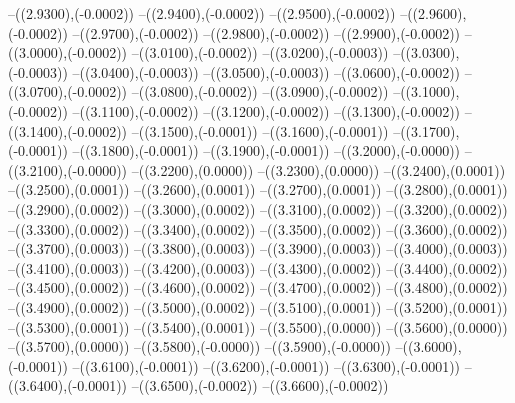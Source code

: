 {	--({\sx*(2.9300)},{\sy*(-0.0002)})
	--({\sx*(2.9400)},{\sy*(-0.0002)})
	--({\sx*(2.9500)},{\sy*(-0.0002)})
	--({\sx*(2.9600)},{\sy*(-0.0002)})
	--({\sx*(2.9700)},{\sy*(-0.0002)})
	--({\sx*(2.9800)},{\sy*(-0.0002)})
	--({\sx*(2.9900)},{\sy*(-0.0002)})
	--({\sx*(3.0000)},{\sy*(-0.0002)})
	--({\sx*(3.0100)},{\sy*(-0.0002)})
	--({\sx*(3.0200)},{\sy*(-0.0003)})
	--({\sx*(3.0300)},{\sy*(-0.0003)})
	--({\sx*(3.0400)},{\sy*(-0.0003)})
	--({\sx*(3.0500)},{\sy*(-0.0003)})
	--({\sx*(3.0600)},{\sy*(-0.0002)})
	--({\sx*(3.0700)},{\sy*(-0.0002)})
	--({\sx*(3.0800)},{\sy*(-0.0002)})
	--({\sx*(3.0900)},{\sy*(-0.0002)})
	--({\sx*(3.1000)},{\sy*(-0.0002)})
	--({\sx*(3.1100)},{\sy*(-0.0002)})
	--({\sx*(3.1200)},{\sy*(-0.0002)})
	--({\sx*(3.1300)},{\sy*(-0.0002)})
	--({\sx*(3.1400)},{\sy*(-0.0002)})
	--({\sx*(3.1500)},{\sy*(-0.0001)})
	--({\sx*(3.1600)},{\sy*(-0.0001)})
	--({\sx*(3.1700)},{\sy*(-0.0001)})
	--({\sx*(3.1800)},{\sy*(-0.0001)})
	--({\sx*(3.1900)},{\sy*(-0.0001)})
	--({\sx*(3.2000)},{\sy*(-0.0000)})
	--({\sx*(3.2100)},{\sy*(-0.0000)})
	--({\sx*(3.2200)},{\sy*(0.0000)})
	--({\sx*(3.2300)},{\sy*(0.0000)})
	--({\sx*(3.2400)},{\sy*(0.0001)})
	--({\sx*(3.2500)},{\sy*(0.0001)})
	--({\sx*(3.2600)},{\sy*(0.0001)})
	--({\sx*(3.2700)},{\sy*(0.0001)})
	--({\sx*(3.2800)},{\sy*(0.0001)})
	--({\sx*(3.2900)},{\sy*(0.0002)})
	--({\sx*(3.3000)},{\sy*(0.0002)})
	--({\sx*(3.3100)},{\sy*(0.0002)})
	--({\sx*(3.3200)},{\sy*(0.0002)})
	--({\sx*(3.3300)},{\sy*(0.0002)})
	--({\sx*(3.3400)},{\sy*(0.0002)})
	--({\sx*(3.3500)},{\sy*(0.0002)})
	--({\sx*(3.3600)},{\sy*(0.0002)})
	--({\sx*(3.3700)},{\sy*(0.0003)})
	--({\sx*(3.3800)},{\sy*(0.0003)})
	--({\sx*(3.3900)},{\sy*(0.0003)})
	--({\sx*(3.4000)},{\sy*(0.0003)})
	--({\sx*(3.4100)},{\sy*(0.0003)})
	--({\sx*(3.4200)},{\sy*(0.0003)})
	--({\sx*(3.4300)},{\sy*(0.0002)})
	--({\sx*(3.4400)},{\sy*(0.0002)})
	--({\sx*(3.4500)},{\sy*(0.0002)})
	--({\sx*(3.4600)},{\sy*(0.0002)})
	--({\sx*(3.4700)},{\sy*(0.0002)})
	--({\sx*(3.4800)},{\sy*(0.0002)})
	--({\sx*(3.4900)},{\sy*(0.0002)})
	--({\sx*(3.5000)},{\sy*(0.0002)})
	--({\sx*(3.5100)},{\sy*(0.0001)})
	--({\sx*(3.5200)},{\sy*(0.0001)})
	--({\sx*(3.5300)},{\sy*(0.0001)})
	--({\sx*(3.5400)},{\sy*(0.0001)})
	--({\sx*(3.5500)},{\sy*(0.0000)})
	--({\sx*(3.5600)},{\sy*(0.0000)})
	--({\sx*(3.5700)},{\sy*(0.0000)})
	--({\sx*(3.5800)},{\sy*(-0.0000)})
	--({\sx*(3.5900)},{\sy*(-0.0000)})
	--({\sx*(3.6000)},{\sy*(-0.0001)})
	--({\sx*(3.6100)},{\sy*(-0.0001)})
	--({\sx*(3.6200)},{\sy*(-0.0001)})
	--({\sx*(3.6300)},{\sy*(-0.0001)})
	--({\sx*(3.6400)},{\sy*(-0.0001)})
	--({\sx*(3.6500)},{\sy*(-0.0002)})
	--({\sx*(3.6600)},{\sy*(-0.0002)})
}
